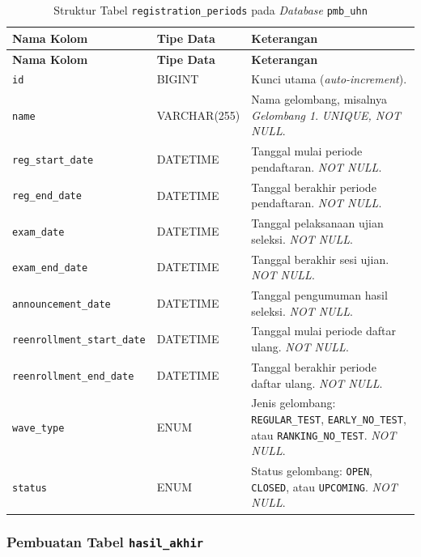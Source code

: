 \begin{longtable}{|L{0.38\textwidth}|L{0.18\textwidth}|L{0.30\textwidth}|}
	\caption{Struktur Tabel \texttt{registration\_periods} pada \textit{Database} \texttt{pmb\_uhn}}
	\label{fig:4.db.periods}\\
	\hline
	\textbf{Nama Kolom} & \textbf{Tipe Data} & \textbf{Keterangan} \\
	\hline
	\endfirsthead
	\hline
	\textbf{Nama Kolom} & \textbf{Tipe Data} & \textbf{Keterangan} \\
	\hline
	\endhead
	\texttt{id} & BIGINT & Kunci utama (\textit{auto-increment}). \\
	\hline
	\texttt{name} & VARCHAR(255) & Nama gelombang, misalnya \textit{Gelombang 1}. \textit{UNIQUE, NOT NULL}. \\
	\hline
	\texttt{reg\_start\_date} & DATETIME & Tanggal mulai periode pendaftaran. \textit{NOT NULL}. \\
	\hline
	\texttt{reg\_end\_date} & DATETIME & Tanggal berakhir periode pendaftaran. \textit{NOT NULL}. \\
	\hline
	\texttt{exam\_date} & DATETIME & Tanggal pelaksanaan ujian seleksi. \textit{NOT NULL}. \\
	\hline
	\texttt{exam\_end\_date} & DATETIME & Tanggal berakhir sesi ujian. \textit{NOT NULL}. \\
	\hline
	\texttt{announcement\_date} & DATETIME & Tanggal pengumuman hasil seleksi. \textit{NOT NULL}. \\
	\hline
	\texttt{reenrollment\_start\_date} & DATETIME & Tanggal mulai periode daftar ulang. \textit{NOT NULL}. \\
	\hline
	\texttt{reenrollment\_end\_date} & DATETIME & Tanggal berakhir periode daftar ulang. \textit{NOT NULL}. \\
	\hline
	\texttt{wave\_type} & ENUM & Jenis gelombang: \texttt{REGULAR\_TEST}, \texttt{EARLY\_NO\_TEST}, atau \texttt{RANKING\_NO\_TEST}. \textit{NOT NULL}. \\
	\hline
	\texttt{status} & ENUM & Status gelombang: \texttt{OPEN}, \texttt{CLOSED}, atau \texttt{UPCOMING}. \textit{NOT NULL}. \\
	\hline
\end{longtable}

\subsubsection{Pembuatan Tabel \texttt{hasil\_akhir}} \label{IV.DB.HasilAkhir}

